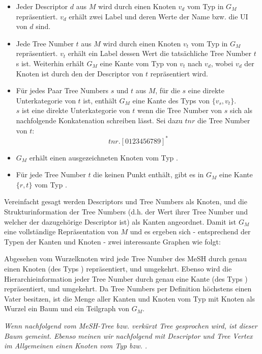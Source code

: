 \begin{itemize}
 \item Jeder Descriptor $d$ aus $M$ wird durch einen Knoten $v_d$ vom Typ  in $G_M$ repräsentiert. $v_d$ erhält zwei Label  und  deren Werte der Name bzw. die UI von $d$ sind.
 \item Jede Tree Number $t$ aus $M$ wird durch einen Knoten $v_t$ vom Typ  in $G_M$ repräsentiert. $v_t$ erhält ein Label  dessen Wert die tatsächliche Tree Number $t$ s ist. Weiterhin erhält $G_M$ eine Kante vom Typ  von $v_t$ nach $v_d$, wobei $v_d$ der Knoten ist durch den der Descriptor von $t$ repräsentiert wird.
 \item Für jedes Paar Tree Numbers $s$ und $t$ aus $M$, für die $s$ eine direkte Unterkategorie von $t$ ist, enthält $G_M$ eine Kante des Typs  von $\{v_s,v_t\}$. \\ $s$ ist eine direkte Unterkategorie von $t$ wenn die Tree Number von $s$ sich als nachfolgende Konkatenation schreiben lässt. Sei dazu $tnr$ die Tree Number von $t$: \[tnr.[0123456789]^*\] \par
 \item $G_M$ erhält einen ausgezeichneten Knoten  vom Typ .
 \item Für jede Tree Number $t$ die keinen Punkt enthält, gibt es in $G_M$ eine Kante $\{r,t\}$ vom Typ .
\end{itemize}

Vereinfacht gesagt werden Descriptors und Tree Numbers als Knoten, und die Strukturinformation der Tree Numbers (d.h. der Wert ihrer Tree Number und welcher der dazugehörige Descriptor ist) als Kanten angeordnet. Damit ist $G_M$ eine vollständige Repräsentation von $M$ und es ergeben sich - entsprechend der Typen der Kanten und Knoten - zwei interessante Graphen wie folgt:

Abgesehen vom Wurzelknoten wird jede Tree Number des MeSH durch genau einen Knoten (des Typs ) repräsentiert, und umgekehrt. Ebenso wird die Hierarchieinformation jeder Tree Number durch genau eine Kante (des Typs ) repräsentiert, und umgekehrt. Da Tree Numbers per Definition höchstens einen Vater besitzen, ist die Menge aller Kanten und Knoten vom Typ  mit Knoten  als Wurzel ein Baum und ein Teilgraph von $G_M$. \par
\textit{Wenn nachfolgend vom \textit{MeSH-Tree} bzw. verkürzt \textit{Tree} gesprochen wird, ist dieser Baum gemeint. Ebenso meinen wir nachfolgend mit \textit{Descriptor} und \textit{Tree Vertex} im Allgemeinen einen Knoten vom Typ  bzw. .}

